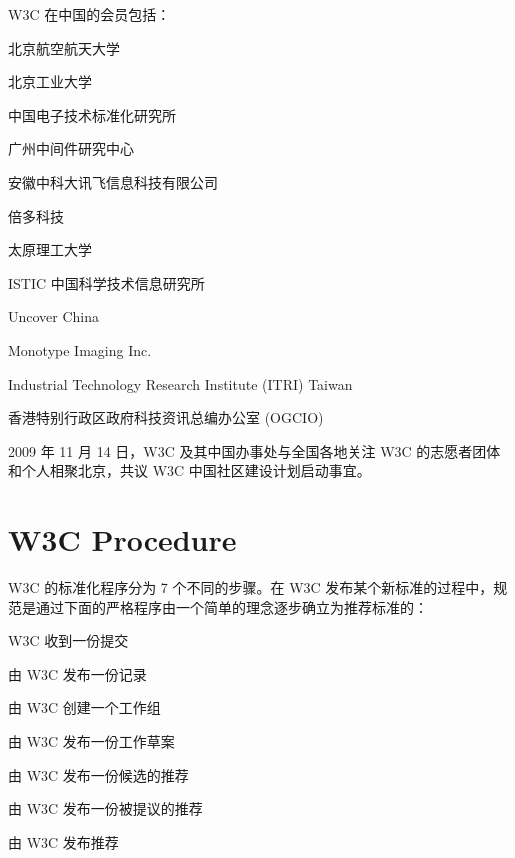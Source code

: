 W3C 在中国的会员包括：

\begin{compactitem}
\item 北京航空航天大学
\item 北京工业大学
\item 中国电子技术标准化研究所
\item 广州中间件研究中心
\item 安徽中科大讯飞信息科技有限公司
\item 倍多科技
\item 太原理工大学
\item ISTIC 中国科学技术信息研究所
\item Uncover China
\item Monotype Imaging Inc.
\item Industrial Technology Research Institute (ITRI) Taiwan
\item 香港特别行政区政府科技资讯总编办公室 (OGCIO)
\end{compactitem}

2009 年 11 月 14 日，W3C 及其中国办事处与全国各地关注 W3C 的志愿者团体和个人相聚北京，共议 W3C 中国社区建设计划启动事宜。

\section{W3C Procedure}

W3C 的标准化程序分为 7 个不同的步骤。在 W3C 发布某个新标准的过程中，规范是通过下面的严格程序由一个简单的理念逐步确立为推荐标准的：

\begin{compactitem}
\item W3C 收到一份提交
\item 由 W3C 发布一份记录
\item 由 W3C 创建一个工作组
\item 由 W3C 发布一份工作草案
\item 由 W3C 发布一份候选的推荐
\item 由 W3C 发布一份被提议的推荐
\item 由 W3C 发布推荐
\end{compactitem}


